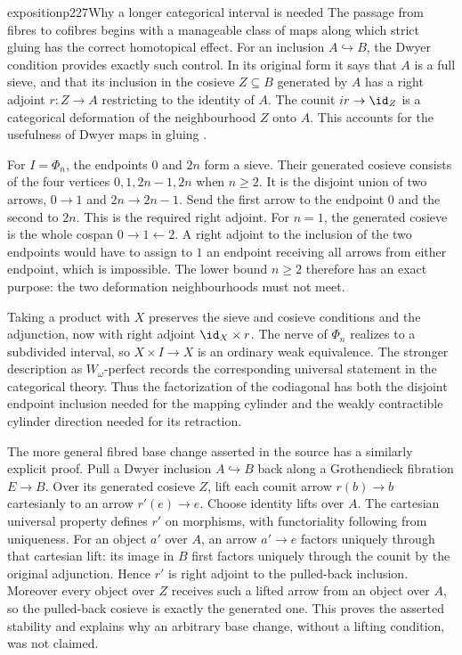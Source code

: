 \begin{dcomment}{exposition}{p227}{Why a longer categorical interval is needed}
The passage from fibres to cofibres begins with a manageable class of maps along which strict gluing has the correct homotopical effect. For an inclusion $A\hookrightarrow B$, the Dwyer condition provides exactly such control. In its original form it says that $A$ is a full sieve, and that its inclusion in the cosieve $Z\subseteq B$ generated by $A$ has a right adjoint $r:Z\to A$ restricting to the identity of $A$. The counit $ir\to\id_Z$ is a categorical deformation of the neighbourhood $Z$ onto $A$. This accounts for the usefulness of Dwyer maps in gluing \citep[Definition 4.1 and Proposition 4.3]{Thomason1980}.

For $I=\Phi_n$, the endpoints $0$ and $2n$ form a sieve. Their generated cosieve consists of the four vertices $0,1,2n-1,2n$ when $n\geq2$. It is the disjoint union of two arrows, $0\to1$ and $2n\to2n-1$. Send the first arrow to the endpoint $0$ and the second to $2n$. This is the required right adjoint. For $n=1$, the generated cosieve is the whole cospan $0\to1\leftarrow2$. A right adjoint to the inclusion of the two endpoints would have to assign to $1$ an endpoint receiving all arrows from either endpoint, which is impossible. The lower bound $n\geq2$ therefore has an exact purpose: the two deformation neighbourhoods must not meet.

Taking a product with $X$ preserves the sieve and cosieve conditions and the adjunction, now with right adjoint $\id_X\times r$. The nerve of $\Phi_n$ realizes to a subdivided interval, so $X\times I\to X$ is an ordinary weak equivalence. The stronger description as $W_\omega$-perfect records the corresponding universal statement in the categorical theory. Thus the factorization of the codiagonal has both the disjoint endpoint inclusion needed for the mapping cylinder and the weakly contractible cylinder direction needed for its retraction.

The more general fibred base change asserted in the source has a similarly explicit proof. Pull a Dwyer inclusion $A\hookrightarrow B$ back along a Grothendieck fibration $E\to B$. Over its generated cosieve $Z$, lift each counit arrow $r(b)\to b$ cartesianly to an arrow $r'(e)\to e$. Choose identity lifts over $A$. The cartesian universal property defines $r'$ on morphisms, with functoriality following from uniqueness. For an object $a'$ over $A$, an arrow $a'\to e$ factors uniquely through that cartesian lift: its image in $B$ first factors uniquely through the counit by the original adjunction. Hence $r'$ is right adjoint to the pulled-back inclusion. Moreover every object over $Z$ receives such a lifted arrow from an object over $A$, so the pulled-back cosieve is exactly the generated one. This proves the asserted stability and explains why an arbitrary base change, without a lifting condition, was not claimed.


\end{dcomment}
